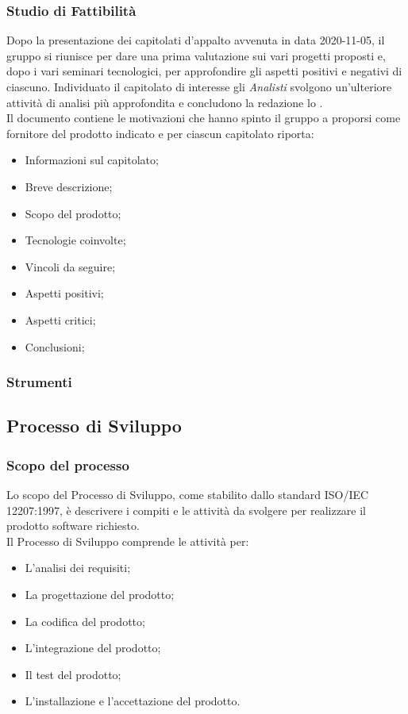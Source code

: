 \subsubsection{Studio di Fattibilità}
Dopo la presentazione dei capitolati d'appalto avvenuta in data 2020-11-05, il gruppo si riunisce per dare una prima valutazione sui vari progetti proposti e, dopo i vari seminari tecnologici, per approfondire gli aspetti positivi e negativi di ciascuno. Individuato il capitolato di interesse gli \textit{Analisti} svolgono un'ulteriore attività di analisi più approfondita e concludono la redazione lo \SdF. \\
Il documento contiene le motivazioni che hanno spinto il gruppo a proporsi come fornitore del prodotto indicato e per ciascun capitolato riporta:
\begin{itemize}
\item Informazioni sul capitolato;
\item Breve descrizione;
\item Scopo del prodotto;
\item Tecnologie coinvolte;
\item Vincoli da seguire;
\item Aspetti positivi;
\item Aspetti critici;
\item Conclusioni;
\end{itemize}

\subsubsection{Strumenti}

\newpage

\subsection{Processo di Sviluppo}
\subsubsection{Scopo del processo}
Lo scopo del Processo di Sviluppo, come stabilito dallo standard ISO/IEC 12207:1997, è descrivere i compiti e le attività da svolgere per realizzare il prodotto software richiesto. \\
Il Processo di Sviluppo comprende le attività per:
\begin{itemize}
	\item L'analisi dei requisiti;
	\item La progettazione del prodotto;
	\item La codifica del prodotto;
	\item L'integrazione del prodotto;
	\item Il test del prodotto;
	\item L'installazione e l'accettazione del prodotto.
\end{itemize}

